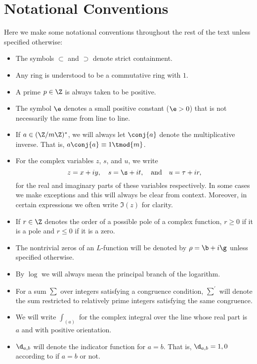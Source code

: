     \section{Notational Conventions}
      Here we make some notational conventions throughout the rest of the text unless specified otherwise:
      \begin{itemize}
        \item The symbols $\subset$ and $\supset$ denote strict containment.
        \item Any ring is understood to be a commutative ring with $1$.
        \item A prime $p \in \Z$ is always taken to be positive.
        \item The symbol $\e$ denotes a small positive constant ($\e > 0$) that is not necessarily the same from line to line.
        \item If $a \in (\Z/m\Z)^{\ast}$, we will always let $\conj{a}$ denote the multiplicative inverse. That is, $a\conj{a} \equiv 1 \tmod{m}$.  
        \item For the complex variables $z$, $s$, and $u$, we write
        \[
          z = x+iy, \quad s = \s+it, \quad \text{and} \quad u = \tau+ir,
        \]
        for the real and imaginary parts of these variables respectively. In some cases we make exceptions and this will always be clear from context. Moreover, in certain expressions we often write $\Im(z)$ for clarity.
        \item If $r \in \Z$ denotes the order of a possible pole of a complex function, $r \ge 0$ if it is a pole and $r \le 0$ if it is a zero.
        \item The nontrivial zeros of an $L$-function will be denoted by $\rho = \b+i\g$ unless specified otherwise.
        \item By $\log$ we will always mean the principal branch of the logarithm.
        \item For a sum $\sum$ over integers satisfying a congruence condition, $\sum^{'}$ will denote the sum restricted to relatively prime integers satisfying the same congruence.
        \item We will write $\int_{(a)}$ for the complex integral over the line whose real part is $a$ and with positive orientation.
        \item $\d_{a,b}$ will denote the indicator function for $a = b$. That is, $\d_{a,b} = 1,0$ according to if $a = b$ or not.
      \end{itemize}
